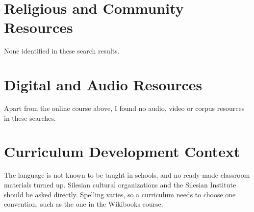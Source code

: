\documentclass[12pt]{article}
\begin{document}
\section{Religious and Community Resources}
None identified in these search results.

\section{Digital and Audio Resources}
Apart from the online course above, I found no audio, video or corpus resources in these searches.

\section{Curriculum Development Context}
The language is not known to be taught in schools, and no ready-made classroom materials turned up. Silesian cultural organizations and the Silesian Institute should be asked directly. Spelling varies, so a curriculum needs to choose one convention, such as the one in the Wikibooks course.
\end{document}

